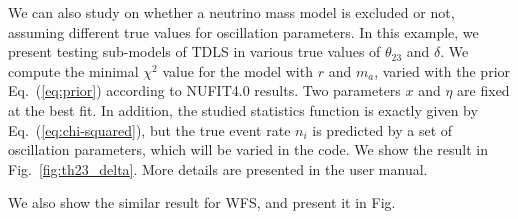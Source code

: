 \documentclass[aps,prd,nofootinbib,preprint]{revtex4}
\begin{document}
We can also study on whether a neutrino mass model is excluded or not, assuming different true values for oscillation parameters. In this example, we present testing sub-models of TDLS in various true values of $\theta_{23}$ and $\delta$. We compute the minimal $\chi^2$ value for the model with $r$ and $m_a$, varied with the prior Eq.~(\ref{eq:prior}) according to NUFIT4.0 results. Two parameters $x$ and $\eta$ are fixed at the best fit. In addition, the studied statistics function is exactly given by Eq.~(\ref{eq:chi-squared}), but the true event rate $n_i$ is predicted by a set of oscillation parameters, which will be varied in the code. 
%
We show the result in Fig.~\ref{fig:th23_delta}. More details are presented in the user manual. 

{\color{red}We also show the similar result for WFS, and present it in Fig.}


%
\end{document}
